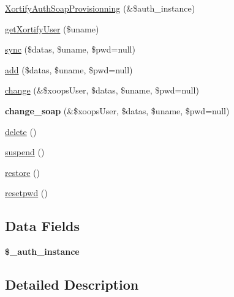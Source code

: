 \begin{DoxyCompactItemize}
\item 
\hyperlink{class_xortify_auth_soap_provisionning_a8b92f1ad88521a50ccad3531e57bafef}{Xortify\-Auth\-Soap\-Provisionning} (\&\$auth\-\_\-instance)
\item 
\hyperlink{class_xortify_auth_soap_provisionning_a041d726ac26672547ed1504e8e0117aa}{get\-Xortify\-User} (\$uname)
\item 
\hyperlink{class_xortify_auth_soap_provisionning_a35dc08b0f2138eb818ff95345b73bcff}{sync} (\$datas, \$uname, \$pwd=null)
\item 
\hyperlink{class_xortify_auth_soap_provisionning_adfc9fcef01e7bd7b2f47e8e79d51fc63}{add} (\$datas, \$uname, \$pwd=null)
\item 
\hyperlink{class_xortify_auth_soap_provisionning_ae1f0971b9712c794620cf309164e43af}{change} (\&\$xoops\-User, \$datas, \$uname, \$pwd=null)
\item 
\hypertarget{class_xortify_auth_soap_provisionning_a6b0d41baa32408f3442dfcfaf7cdc786}{{\bfseries change\-\_\-soap} (\&\$xoops\-User, \$datas, \$uname, \$pwd=null)}\label{class_xortify_auth_soap_provisionning_a6b0d41baa32408f3442dfcfaf7cdc786}

\item 
\hyperlink{class_xortify_auth_soap_provisionning_a13bdffdd926f26b825ea57066334ff01}{delete} ()
\item 
\hyperlink{class_xortify_auth_soap_provisionning_ad73006a505121228f3b075c2409787d2}{suspend} ()
\item 
\hyperlink{class_xortify_auth_soap_provisionning_aa1371f22826cf8cde4454c9b467203d0}{restore} ()
\item 
\hyperlink{class_xortify_auth_soap_provisionning_a06d70fbd3a2db390b6f2530c0076628e}{resetpwd} ()
\end{DoxyCompactItemize}
\subsection*{Data Fields}
\begin{DoxyCompactItemize}
\item 
\hypertarget{class_xortify_auth_soap_provisionning_a486ed878bb5a7188c99ac4c9ee46ac6e}{{\bfseries \$\-\_\-auth\-\_\-instance}}\label{class_xortify_auth_soap_provisionning_a486ed878bb5a7188c99ac4c9ee46ac6e}

\end{DoxyCompactItemize}


\subsection{Detailed Description}



